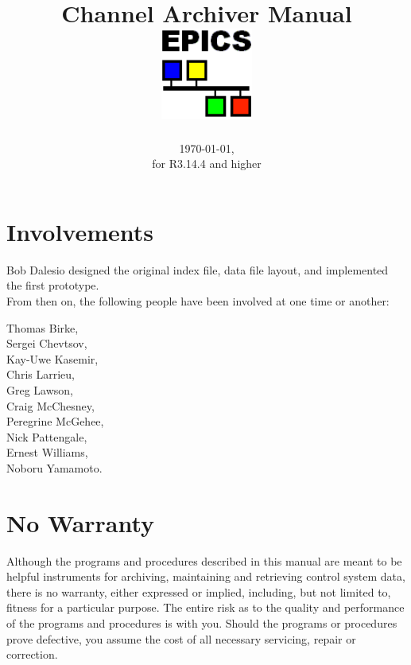 \documentclass{report}
\begin{document}
\sffamily
\title{\Huge Channel Archiver Manual\\[1cm]
\includegraphics[width=3cm]{logo101}
}
\date{\today,\\ for R3.14.4 and higher}
\maketitle
\newpage

\pagestyle{empty}

\section*{Involvements}
Bob Dalesio designed the original index file, data file layout,
and implemented the first prototype.\\
From then on, the following people have been involved at one
time or another:\\
\begin{center}
Thomas Birke,\\
Sergei Chevtsov,\\
Kay-Uwe Kasemir,\\ 
Chris Larrieu,\\
Greg Lawson,\\
Craig McChesney,\\
Peregrine McGehee,\\
Nick Pattengale,\\
Ernest Williams,\\
Noboru Yamamoto.
\end{center}

\section*{No Warranty}
Although the programs and procedures described in this manual are
meant to be helpful instruments for archiving, maintaining and
retrieving control system data, there is no warranty, either expressed
or implied, including, but not limited to, fitness for a particular
purpose. The entire risk as to the quality and performance of the
programs and procedures is with you.  Should the programs or
procedures prove defective, you assume the cost of all necessary
servicing, repair or correction.
\end{document}
